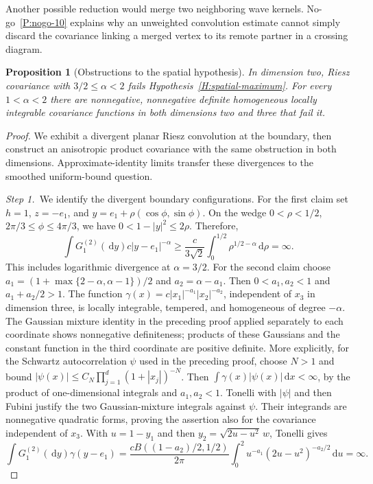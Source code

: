 \documentclass[12pt,oneside,openany]{book}
\numberwithin{equation}{section}
\newtheorem{proposition}[theorem]{Proposition}
\theoremstyle{nogostyle}
\theoremstyle{definition}
\newcommand{\ud}{\,\mathrm{d}}
\begin{document}
Another possible reduction would merge two neighboring wave kernels.
No-go~\ref{P:nogo-10} explains why an unweighted convolution estimate
cannot simply discard the covariance linking a merged vertex to its remote
partner in a crossing diagram.


\begin{proposition}[Obstructions to the spatial hypothesis]
  \label{P:higher-obstructions}
  In dimension two, Riesz covariance with $3/2 \le \alpha < 2$ fails
  Hypothesis~\ref{H:spatial-maximum}. For every $1 < \alpha < 2$ there are
  nonnegative, nonnegative definite homogeneous locally integrable covariance
  functions in both dimensions two and three that fail it.
\end{proposition}

\begin{proof}
  We exhibit a divergent planar Riesz convolution at the boundary, then
  construct an anisotropic product covariance with the same obstruction in
  both dimensions. Approximate-identity limits transfer these divergences to
  the smoothed uniform-bound question.


  \medskip
  \noindent\textit{Step 1.~}We identify the divergent boundary configurations.
  For the first claim set $h = 1$, $z = -e_1$, and $y =
  e_1+\rho(\cos\phi,\sin\phi)$. On the wedge $0 < \rho < 1/2$, $2\pi/3 \le \phi
  \le 4\pi/3$, we have $0 < 1-|y|^2 \le 2\rho$. Therefore,
  \[
    \int G_1^{(2)}(\ud y)c|y-e_1|^{-\alpha}
    \ge\frac{c}{3\sqrt2}\int_0^{1/2}\rho^{1/2-\alpha}\ud\rho
    =\infty.
  \]
  This includes logarithmic divergence at $\alpha = 3/2$. For the second claim
  choose $a_1 = (1+\max\{2-\alpha,\alpha-1\})/2$ and $a_2 = \alpha-a_1$. Then $0
  < a_1,a_2 < 1$ and $a_1+a_2/2 > 1$. The function $\gamma(x) =
  c|x_1|^{-a_1}|x_2|^{-a_2}$, independent of $x_3$ in dimension three, is
  locally integrable, tempered, and homogeneous of degree $-\alpha$. The
  Gaussian mixture identity in the preceding proof applied separately to each
  coordinate shows nonnegative definiteness; products of these Gaussians and the
  constant function in the third coordinate are positive definite. More
  explicitly, for the Schwartz autocorrelation $\psi$ used in the preceding
  proof, choose $N > 1$ and bound $|\psi(x)| \le
  C_N\prod_{j=1}^d(1+|x_j|)^{-N}$. Then $\int\gamma(x)|\psi(x)|\ud x < \infty$,
  by the product of one-dimensional integrals and $a_1,a_2 < 1$. Tonelli with
  $|\psi|$ and then Fubini justify the two Gaussian-mixture integrals against
  $\psi$. Their integrands are nonnegative quadratic forms, proving the
  assertion also for the covariance independent of $x_3$. With $u = 1-y_1$ and
  then $y_2 = \sqrt{2u-u^2}\,w$, Tonelli gives
  \[
    \int G_1^{(2)}(\ud y)\gamma(y-e_1)
    =\frac{c B((1-a_2)/2,1/2)}{2\pi}
    \int_0^2u^{-a_1}(2u-u^2)^{-a_2/2}\ud u=\infty.
  \]


\end{proof}
\end{document}
